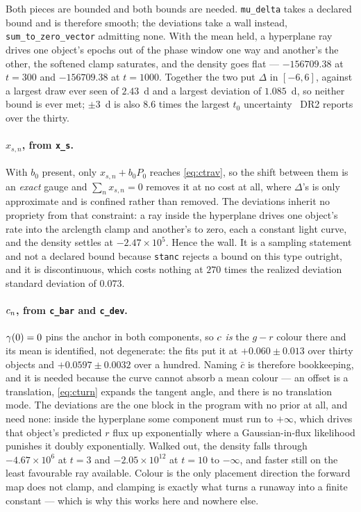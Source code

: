 \documentclass[11pt]{article}
\newcommand{\code}[1]{\texttt{#1}}
\begin{document}
Both pieces are bounded and both bounds are needed. \code{mu\_delta} takes a declared bound
and is therefore smooth; the deviations take a wall instead, \code{sum\_to\_zero\_vector}
admitting none. With the mean held, a hyperplane ray drives one object's epochs out of the
phase window one way and another's the other, the softened clamp saturates, and the density
goes flat --- $-156709.38$ at $t = 300$ and $-156709.38$ at $t = 1000$. Together the two put
$\Delta$ in $[-6, 6]$, against a largest draw ever seen of $2.43$~d and a largest deviation
of $1.085$~d, so neither bound is ever met; $\pm3$~d is also $8.6$ times the largest $t_{0}$
uncertainty \ztf\ DR2 reports over the thirty.

\paragraph{$x_{s,n}$, from \code{x\_s}.} With $b_{0}$ present, only $x_{s,n} + b_{0}P_{0}$
reaches \eqref{eq:ctrav}, so the shift between them is an \emph{exact} gauge and
$\sum_{n} x_{s,n} = 0$ removes it at no cost at all, where $\Delta$'s is only approximate
and is confined rather than removed. The deviations
inherit no propriety from that constraint: a ray inside the hyperplane drives one object's
rate into the arclength clamp and another's to zero, each a constant light curve, and the
density settles at $-2.47\times10^{5}$. Hence the wall. It is a sampling statement and not a
declared bound because \code{stanc} rejects a bound on this type outright, and it is
discontinuous, which costs nothing at $270$ times the realized deviation standard deviation
of $0.073$.

\paragraph{$c_{n}$, from \code{c\_bar} and \code{c\_dev}.} $\gamma(0) = 0$ pins the
anchor in both components, so $c$ \emph{is} the $g-r$ colour there and its mean is
identified, not degenerate: the fits put it at $+0.060 \pm 0.013$ over thirty objects and
$+0.0597 \pm 0.0032$ over a hundred. Naming $\bar c$ is therefore bookkeeping, and it is
needed because the curve cannot absorb a mean colour --- an offset is a translation,
\eqref{eq:cturn} expands the tangent angle, and there is no translation mode. The
deviations are the one block in the program with no prior at all, and need none: inside the
hyperplane some component must run to $+\infty$, which drives that object's predicted $r$
flux up exponentially where a Gaussian-in-flux likelihood punishes it doubly exponentially.
Walked out, the density falls through $-4.67\times10^{6}$ at $t = 3$ and
$-2.05\times10^{12}$ at $t = 10$ to $-\infty$, and faster still on the least favourable ray
available. Colour is the only placement direction the forward map does not clamp, and
clamping is exactly what turns a runaway into a finite constant --- which is why this works
here and nowhere else.
\end{document}

